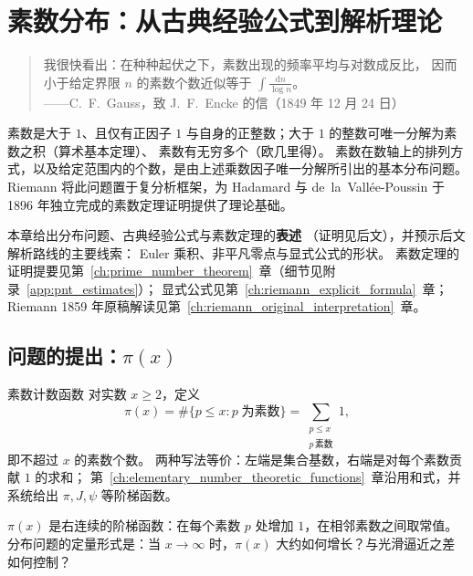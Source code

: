 
\chapter{素数分布：从古典经验公式到解析理论}\label{ch:prime_distribution}

\vspace{0.6em}
\begin{quote}
\small
我很快看出：在种种起伏之下，素数出现的频率平均与对数成反比，
因而小于给定界限 $n$ 的素数个数近似等于
$\int \frac{\mathrm{d}n}{\log n}$。\\[4pt]
\hfill——C.~F.~Gauss，致 J.~F.~Encke 的信（1849 年 12 月 24 日）
\end{quote}
\vspace{0.6em}

素数是大于 $1$、且仅有正因子 $1$ 与自身的正整数；大于 $1$ 的整数可唯一分解为素数之积（算术基本定理）、
素数有无穷多个（欧几里得）。
素数在数轴上的排列方式，以及给定范围内的个数，是由上述乘数因子唯一分解所引出的基本分布问题。
Riemann 将此问题置于复分析框架，为 Hadamard 与 de~la~Vallée-Poussin
于 1896 年独立完成的素数定理证明提供了理论基础。

本章给出分布问题、古典经验公式与素数定理的\textbf{表述}
（证明见后文），并预示后文解析路线的主要线索：
Euler 乘积、非平凡零点与显式公式的形状。
素数定理的证明提要见第~\ref{ch:prime_number_theorem}~章（细节见附录~\ref{app:pnt_estimates}）；
显式公式见第~\ref{ch:riemann_explicit_formula}~章；
Riemann 1859 年原稿解读见第~\ref{ch:riemann_original_interpretation}~章。

\section{问题的提出：\texorpdfstring{$\pi(x)$}{pi(x)}}\label{sec:prime_atoms}

\begin{definition}{素数计数函数}{}
\label{def:pi-ch1}
对实数 $x \geq 2$，定义
\[
\pi(x)
=\#\{p \leq x : p \;\text{为素数}\}
=\sum_{\substack{p \leq x \\ p\,\text{素数}}} 1,
\]
即不超过 $x$ 的素数个数。
两种写法等价：左端是集合基数，右端是对每个素数贡献 $1$ 的求和；
第~\ref{ch:elementary_number_theoretic_functions}~章沿用和式，并系统给出 $\pi,J,\psi$ 等阶梯函数。
\end{definition}

$\pi(x)$ 是右连续的阶梯函数：在每个素数 $p$ 处增加 $1$，在相邻素数之间取常值。
分布问题的定量形式是：当 $x\to\infty$ 时，$\pi(x)$ 大约如何增长？与光滑逼近之差如何控制？

